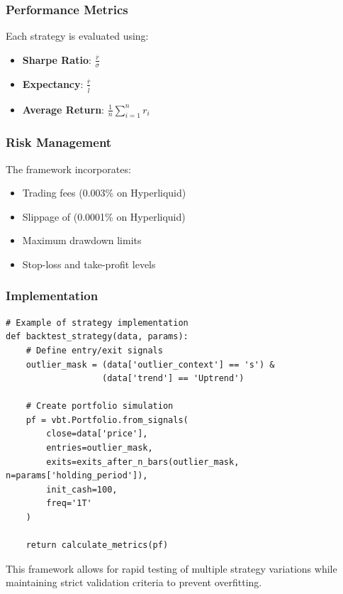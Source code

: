 \documentclass[12pt]{article}
\begin{document}
\subsubsection*{Performance Metrics}
Each strategy is evaluated using:
\begin{itemize}
  \item \textbf{Sharpe Ratio}: $\frac{\overline{r}}{\sigma}$
  \item \textbf{Expectancy}: $\frac{\overline{r}}{\overline{l}}$
  \item \textbf{Average Return}: $\frac{1}{n}\sum_{i=1}^{n} r_i$
\end{itemize}

\subsubsection*{Risk Management}
The framework incorporates:
\begin{itemize}
  \item Trading fees (0.003\% on Hyperliquid)
  \item  Slippage of (0.0001\% on Hyperliquid)
  \item Maximum drawdown limits
  \item Stop-loss and take-profit levels
\end{itemize}

\subsubsection*{Implementation}
\begin{verbatim}
# Example of strategy implementation
def backtest_strategy(data, params):
    # Define entry/exit signals
    outlier_mask = (data['outlier_context'] == 's') & 
                   (data['trend'] == 'Uptrend')
    
    # Create portfolio simulation
    pf = vbt.Portfolio.from_signals(
        close=data['price'],
        entries=outlier_mask,
        exits=exits_after_n_bars(outlier_mask, n=params['holding_period']),
        init_cash=100,
        freq='1T'
    )
    
    return calculate_metrics(pf)
\end{verbatim}

This framework allows for rapid testing of multiple strategy variations while maintaining strict validation criteria to prevent overfitting.
\end{document}
